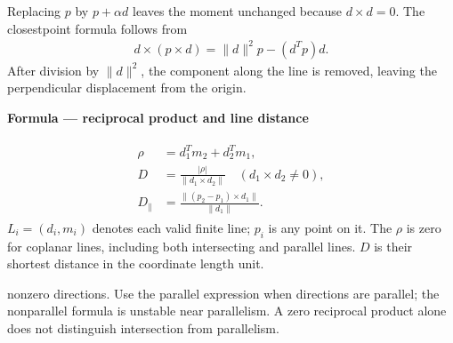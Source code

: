 \documentclass[letterpaper,11pt,english,openany,oneside]{jupyterBook}
\begin{document}
\sphinxAtStartPar
Replacing \(p\) by \(p+\alpha d\) leaves the moment unchanged because \(d\times d=0\). The closest\sphinxhyphen{}point formula follows from
\begin{equation*}
\begin{split}d\times(p\times d)=\|d\|^2p-(d^Tp)d.\end{split}
\end{equation*}
\sphinxAtStartPar
After division by \(\|d\|^2\), the component along the line is removed, leaving the perpendicular displacement from the origin.

\begin{TextbookBox}
\textbf{Formula — reciprocal product and line distance}\par\smallskip
\begin{equation}\label{equation:lectures/lecture01/planes-lines:eq-lec01-line-distance}
\begin{split}\begin{aligned}
\rho&=d_1^Tm_2+d_2^Tm_1,\\
D&=\frac{|\rho|}{\|d_1\times d_2\|}\quad(d_1\times d_2\ne0),\\
D_\parallel&=\frac{\|(p_2-p_1)\times d_1\|}{\|d_1\|}.
\end{aligned}\end{split}
\end{equation}
\sphinxAtStartPar
\(L_i=(d_i,m_i)\) denotes each valid finite line; \(p_i\) is any point on it. The  \(\rho\) is zero for coplanar lines, including both intersecting and parallel lines. \(D\) is their shortest distance in the coordinate length unit.

\sphinxAtStartPar
{} nonzero directions. Use the parallel expression when directions are parallel; the nonparallel formula is unstable near parallelism. A zero reciprocal product alone does not distinguish intersection from parallelism.

\end{TextbookBox}
\end{document}
